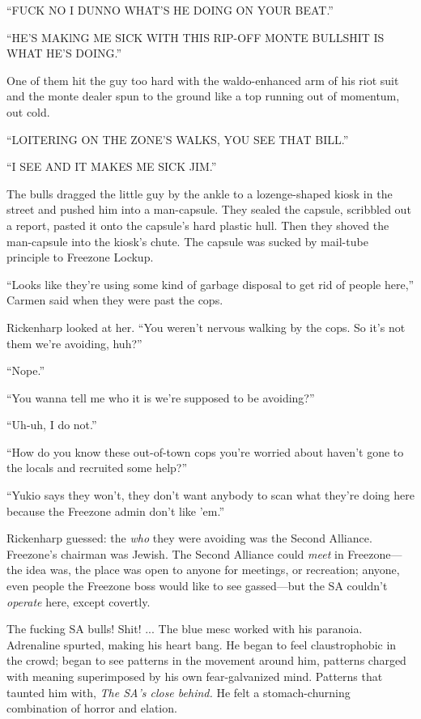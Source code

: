 ``FUCK NO I DUNNO WHAT'S HE DOING ON YOUR BEAT.''

``HE'S MAKlNG ME SICK WITH THIS RIP-OFF MONTE BULLSHIT IS WHAT HE'S DOING.''

One of them hit the guy too hard with the waldo-enhanced arm of his riot suit and the monte dealer spun to the ground like a top running out of momentum, out cold.

``LOITERING ON THE ZONE'S WALKS, YOU SEE THAT BILL.''

``I SEE AND IT MAKES ME SICK JIM.''

The bulls dragged the little guy by the ankle to a lozenge-shaped kiosk in the street and pushed him into a man-capsule. They sealed the capsule, scribbled out a report, pasted it onto the capsule's hard plastic hull. Then they shoved the man-capsule into the kiosk's chute. The capsule was sucked by mail-tube principle to Freezone Lockup.

``Looks like they're using some kind of garbage disposal to get rid of people here,'' Carmen said when they were past the cops.

Rickenharp looked at her. ``You weren't nervous walking by the cops. So it's not them we're avoiding, huh?''

``Nope.''

``You wanna tell me who it is we're supposed to be avoiding?''

``Uh-uh, I do not.''

``How do you know these out-of-town cops you're worried about haven't gone to the locals and recruited some help?''

``Yukio says they won't, they don't want anybody to scan what they're doing here because the Freezone admin don't like 'em.''

Rickenharp guessed: the \textit{who} they were avoiding was the Second Alliance. Freezone's chairman was Jewish. The Second Alliance could \textit{meet} in Freezone---the idea was, the place was open to anyone for meetings, or recreation; anyone, even people the Freezone boss would like to see gassed---but the SA couldn't \textit{operate} here, except covertly.

The fucking SA bulls! Shit! ... The blue mesc worked with his paranoia. Adrenaline spurted, making his heart bang. He began to feel claustrophobic in the crowd; began to see patterns in the movement around him, patterns charged with meaning superimposed by his own fear-galvanized mind. Patterns that taunted him with, \textit{The SA's close behind.} He felt a stomach-churning combination of horror and elation.

